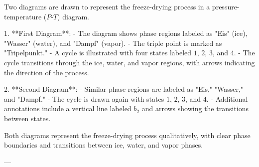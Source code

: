 Two diagrams are drawn to represent the freeze-drying process in a pressure-temperature (\(P\)-\(T\)) diagram.  

1. **First Diagram**:  
   - The diagram shows phase regions labeled as "Eis" (ice), "Wasser" (water), and "Dampf" (vapor).  
   - The triple point is marked as "Tripelpunkt."  
   - A cycle is illustrated with four states labeled \(1\), \(2\), \(3\), and \(4\).  
   - The cycle transitions through the ice, water, and vapor regions, with arrows indicating the direction of the process.  

2. **Second Diagram**:  
   - Similar phase regions are labeled as "Eis," "Wasser," and "Dampf."  
   - The cycle is drawn again with states \(1\), \(2\), \(3\), and \(4\).  
   - Additional annotations include a vertical line labeled \(b_2\) and arrows showing the transitions between states.  

Both diagrams represent the freeze-drying process qualitatively, with clear phase boundaries and transitions between ice, water, and vapor phases.

---